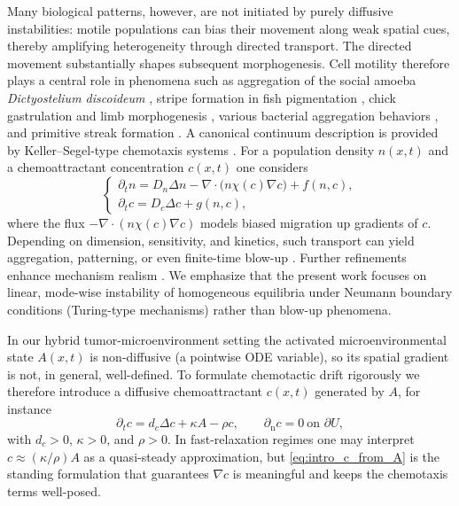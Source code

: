 \documentclass[pdflatex,sn-mathphys-ay]{sn-jnl}
\theoremstyle{thmstyleone}
\theoremstyle{definition}
\theoremstyle{remark}
\begin{document}
Many biological patterns, however, are not initiated by purely diffusive instabilities: motile populations can bias their movement along weak spatial cues, thereby amplifying heterogeneity through directed transport.
The directed movement substantially shapes subsequent morphogenesis.
Cell motility therefore plays a central role in phenomena such as aggregation of the social amoeba \textit{Dictyostelium discoideum} \citep{hofer_dictyostelium_1995}, stripe formation in fish pigmentation \citep{painter_stripe_1999}, chick gastrulation and limb morphogenesis \citep{li_cell_1999,yang_cell_2002}, various bacterial aggregation behaviors \citep{budrene_complex_1991,budrene_dynamics_1995}, and primitive streak formation \citep{painter_chemotactic_2000}. 
A canonical continuum description is provided by Keller--Segel-type chemotaxis systems \citep{keller_initiation_1970,keller_model_1971}. For a population density $n(x,t)$ and a chemoattractant concentration $c(x,t)$ one considers
\begin{equation}
\label{eq:intro_KS}
\begin{cases}
\partial_{t} n = D_n\Delta n - \nabla \cdot \bigl( n \chi(c)\nabla c \bigr) + f(n,c),\\[2pt]
\partial_{t} c = D_c\Delta c + g(n,c),
\end{cases}
\end{equation}
where the flux $-\nabla\cdot(n\chi(c)\nabla c)$ models biased migration up gradients of $c$.
Depending on dimension, sensitivity, and kinetics, such transport can yield aggregation, patterning, or even finite-time blow-up \citep{murray_mathematical_2002,jager_explosions_1992,horstmann_boundedness_2005,jin_critical_2026,horstmann_1970_2003,arumugam_keller-segel_2021}.
Further refinements enhance mechanism realism \citep{martiel_model_1987,goldbeter_biochemical_1996,monk_cyclic_1989,spiro_model_1997}.
We emphasize that the present work focuses on linear, mode-wise instability of homogeneous equilibria under Neumann boundary conditions (Turing-type mechanisms) rather than blow-up phenomena.

In our hybrid tumor-microenvironment setting the activated microenvironmental state $A(x,t)$ is non-diffusive (a pointwise ODE variable), so its spatial gradient is not, in general, well-defined.
To formulate chemotactic drift rigorously we therefore introduce a diffusive chemoattractant $c(x,t)$ generated by $A$, for instance
\begin{equation}
\label{eq:intro_c_from_A}
\partial_t c = d_c\Delta c + \kappa A - \rho c,
\qquad \partial_{\mathrm n}c=0 \ \text{on }\partial U,
\end{equation}
with $d_c>0$, $\kappa>0$, and $\rho>0$.
In fast-relaxation regimes one may interpret $c\approx (\kappa/\rho)A$ as a quasi-steady approximation, but \eqref{eq:intro_c_from_A} is the standing formulation that guarantees $\nabla c$ is meaningful and keeps the chemotaxis terms well-posed.
\end{document}

